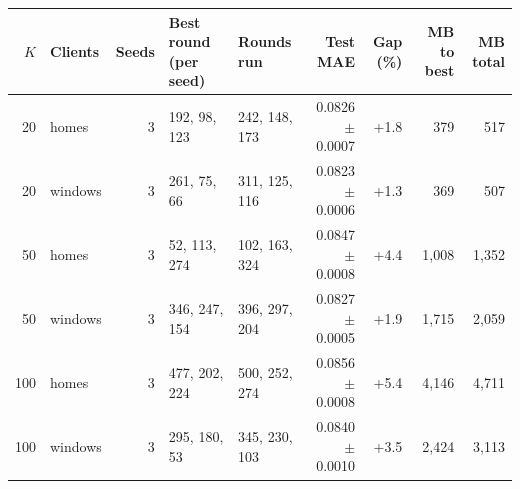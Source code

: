 \begin{tabular}{rlrllrrrr}
\toprule
$K$ & Clients & Seeds & Best round (per seed) & Rounds run & Test MAE & Gap (\%) & MB to best & MB total \\
\midrule
20 & homes & 3 & 192, 98, 123 & 242, 148, 173 & 0.0826 $\pm$ 0.0007 & +1.8 & 379 & 517 \\
20 & windows & 3 & 261, 75, 66 & 311, 125, 116 & 0.0823 $\pm$ 0.0006 & +1.3 & 369 & 507 \\
50 & homes & 3 & 52, 113, 274 & 102, 163, 324 & 0.0847 $\pm$ 0.0008 & +4.4 & 1,008 & 1,352 \\
50 & windows & 3 & 346, 247, 154 & 396, 297, 204 & 0.0827 $\pm$ 0.0005 & +1.9 & 1,715 & 2,059 \\
100 & homes & 3 & 477, 202, 224 & 500, 252, 274 & 0.0856 $\pm$ 0.0008 & +5.4 & 4,146 & 4,711 \\
100 & windows & 3 & 295, 180, 53 & 345, 230, 103 & 0.0840 $\pm$ 0.0010 & +3.5 & 2,424 & 3,113 \\
\bottomrule
\end{tabular}
